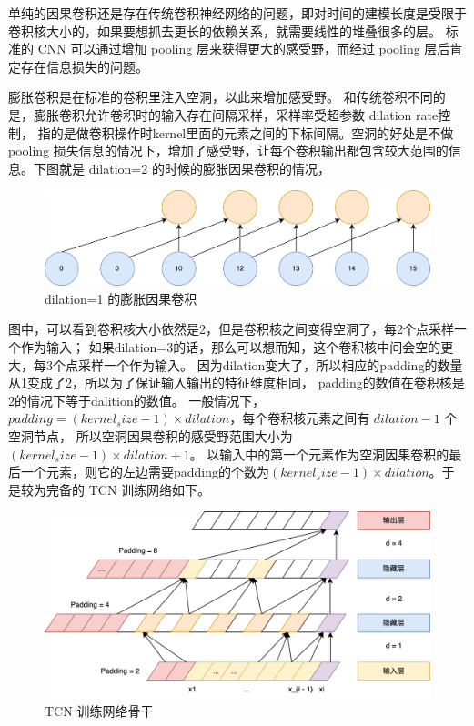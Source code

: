单纯的因果卷积还是存在传统卷积神经网络的问题，即对时间的建模长度是受限于卷积核大小的，如果要想抓去更长的依赖关系，就需要线性的堆叠很多的层。
标准的 CNN 可以通过增加 pooling 层来获得更大的感受野，而经过 pooling 层后肯定存在信息损失的问题。

膨胀卷积是在标准的卷积里注入空洞，以此来增加感受野。
和传统卷积不同的是，膨胀卷积允许卷积时的输入存在间隔采样，采样率受超参数 dilation rate控制，
指的是做卷积操作时kernel里面的元素之间的下标间隔。空洞的好处是不做 pooling 损失信息的情况下，增加了感受野，让每个卷积输出都包含较大范围的信息。下图就是 dilation=2 的时候的膨胀因果卷积的情况，

\begin{figure}[htbp]
  \centering
  \includegraphics[width=\textwidth]{figures/dilation_convolution.png}
  \caption{dilation=1 的膨胀因果卷积}
\end{figure}

图中，可以看到卷积核大小依然是2，但是卷积核之间变得空洞了，每2个点采样一个作为输入；
如果dilation=3的话，那么可以想而知，这个卷积核中间会空的更大，每3个点采样一个作为输入。
因为dilation变大了，所以相应的padding的数量从1变成了2，所以为了保证输入输出的特征维度相同，
padding的数值在卷积核是2的情况下等于dalition的数值。
一般情况下，$padding=(kernel_size-1)\times dilation$，每个卷积核元素之间有 $dilation - 1$ 个空洞节点，
所以空洞因果卷积的感受野范围大小为 $(kernel_size-1) \times dilation + 1$。
以输入中的第一个元素作为空洞因果卷积的最后一个元素，则它的左边需要padding的个数为$(kernel_size-1) \times dilation$。于是较为完备的 TCN 训练网络如下。

\begin{figure}[htbp]
  \centering
  \includegraphics[width=\textwidth]{figures/tcn_1.png}
  \caption{TCN 训练网络骨干}
\end{figure}

